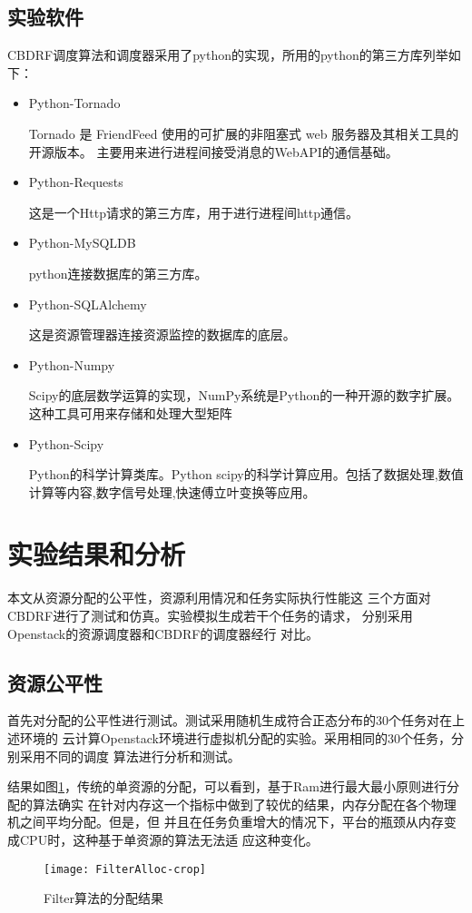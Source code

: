 \subsection{实验软件}
CBDRF调度算法和调度器采用了python的实现，所用的python的第三方库列举如下：
\begin{itemize}
\item Python-Tornado 

Tornado 是 FriendFeed 使用的可扩展的非阻塞式 web 服务器及其相关工具的开源版本。
主要用来进行进程间接受消息的WebAPI的通信基础。
\item Python-Requests 

这是一个Http请求的第三方库，用于进行进程间http通信。
\item Python-MySQLDB  

python连接数据库的第三方库。
\item Python-SQLAlchemy 

这是资源管理器连接资源监控的数据库的底层。
\item Python-Numpy 

Scipy的底层数学运算的实现，NumPy系统是Python的一种开源的数字扩展。这种工具可用来存储和处理大型矩阵
\item Python-Scipy 

Python的科学计算类库。Python scipy的科学计算应用。包括了数据处理,数值计算等内容,数字信号处理,快速傅立叶变换等应用。
\end{itemize}


\section{实验结果和分析}
本文从资源分配的公平性，资源利用情况和任务实际执行性能这
三个方面对CBDRF进行了测试和仿真。实验模拟生成若干个任务的请求，
分别采用Openstack的资源调度器和CBDRF的调度器经行
对比。
\subsection{资源公平性}
首先对分配的公平性进行测试。测试采用随机生成符合正态分布的30个任务对在上述环境的
云计算Openstack环境进行虚拟机分配的实验。采用相同的30个任务，分别采用不同的调度
算法进行分析和测试。

结果如图\ref{fig:FilterAlloc}，传统的单资源的分配，可以看到，基于Ram进行最大最小原则进行分配的算法确实
在针对内存这一个指标中做到了较优的结果，内存分配在各个物理机之间平均分配。但是，但
并且在任务负重增大的情况下，平台的瓶颈从内存变成CPU时，这种基于单资源的算法无法适
应这种变化。
\begin{figure}[htbp]
\centering\texttt{[image: FilterAlloc-crop]}
\caption{Filter算法的分配结果}\label{fig:FilterAlloc}
\end{figure}

